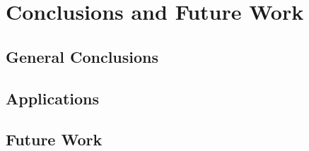 \chapter{Conclusions and Future Work}
\section{General Conclusions}
\section{Applications}
\section{Future Work}


